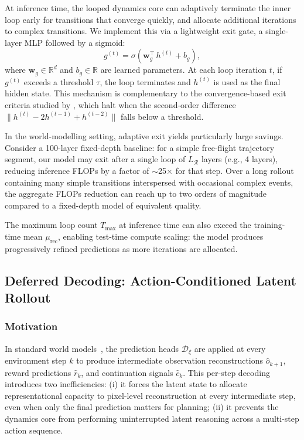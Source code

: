 At inference time, the looped dynamics core can adaptively terminate the inner loop early for transitions that converge quickly, and allocate additional iterations to complex transitions. We implement this via a lightweight exit gate, a single-layer MLP followed by a sigmoid:
\begin{equation}
  g^{(t)} = \sigma\!\left(
    \mathbf{w}_g^\top\, h^{(t)} + b_g
  \right),
  \label{eq:exit_gate}
\end{equation}
where $\mathbf{w}_g \in \mathbb{R}^{d}$ and $b_g \in \mathbb{R}$ are learned parameters. At each loop iteration $t$, if $g^{(t)}$ exceeds a threshold $\tau$, the loop terminates and $h^{(t)}$ is used as the final hidden state. This mechanism is complementary to the convergence-based exit criteria studied by  \citet{pappone2025twoscale}, which halt when the second-order difference $\|h^{(t)} - 2h^{(t-1)} + h^{(t-2)}\|$ falls below a threshold.

In the world-modelling setting, adaptive exit yields particularly large savings. Consider a 100-layer fixed-depth baseline: for a simple free-flight trajectory segment, our model may exit after a single loop of $L_\mathcal{R}$ layers (e.g., 4 layers), reducing inference FLOPs by a factor of $\sim$25$\times$ for that step. Over a long rollout containing many simple transitions interspersed with occasional complex events, the aggregate FLOPs reduction can reach up to two orders of magnitude compared to a fixed-depth model of equivalent quality.

The maximum loop count $T_{\max}$ at inference time can also exceed the training-time mean $\mu_{\mathrm{rec}}$, enabling test-time compute scaling: the model produces progressively refined predictions as more iterations are allocated.

\subsection{Deferred Decoding: Action-Conditioned Latent Rollout}
\label{sec:deferred_decoding}

\subsubsection{Motivation}

In standard world models~\citep{hafner2020dreamerv1,hafner2021dreamerv2,hafner2025dreamerv3}, the prediction heads $\mathcal{D}_\xi$ are applied at every environment step $k$ to produce intermediate observation reconstructions $\hat{o}_{k+1}$, reward predictions $\hat{r}_k$, and continuation signals $\hat{c}_k$. This per-step decoding introduces two inefficiencies: (i) it forces the latent state to allocate representational capacity to pixel-level reconstruction at every intermediate step, even when only the final prediction matters for planning; (ii) it prevents the dynamics core from performing uninterrupted latent reasoning across a multi-step action sequence.

